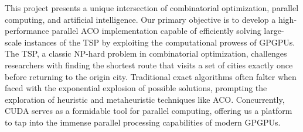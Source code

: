 This project presents a unique intersection of combinatorial optimization, parallel computing, and artificial intelligence. Our primary objective is to develop a high-\/performance parallel ACO implementation capable of efficiently solving large-\/scale instances of the TSP by exploiting the computational prowess of GPGPUs. The TSP, a classic NP-\/hard problem in combinatorial optimization, challenges researchers with finding the shortest route that visits a set of cities exactly once before returning to the origin city. Traditional exact algorithms often falter when faced with the exponential explosion of possible solutions, prompting the exploration of heuristic and metaheuristic techniques like ACO. Concurrently, CUDA serves as a formidable tool for parallel computing, offering us a platform to tap into the immense parallel processing capabilities of modern GPGPUs. 